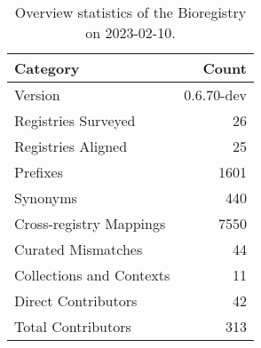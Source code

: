 \begin{table}
\centering
\caption{Overview statistics of the Bioregistry on 2023-02-10.}
\label{tab:bioregistry-summary}
\begin{tabular}{lr}
\toprule
                Category &      Count \\
\midrule
                 Version & 0.6.70-dev \\
     Registries Surveyed &         26 \\
      Registries Aligned &         25 \\
                Prefixes &       1601 \\
                Synonyms &        440 \\
 Cross-registry Mappings &       7550 \\
      Curated Mismatches &         44 \\
Collections and Contexts &         11 \\
     Direct Contributors &         42 \\
      Total Contributors &        313 \\
\bottomrule
\end{tabular}
\end{table}
